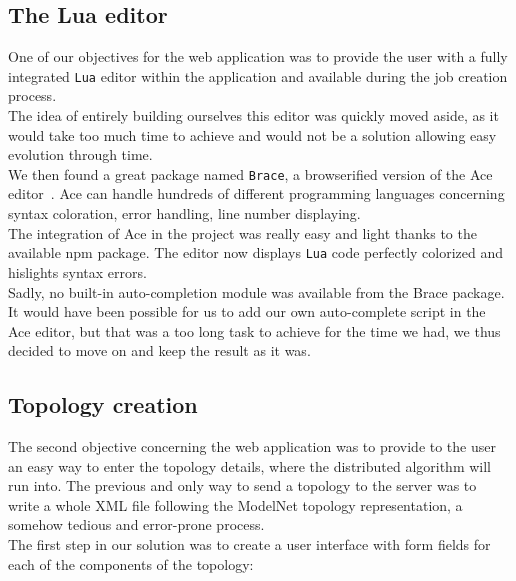 \documentclass{eplmastersthesis}
\begin{document}
        \subsection{The Lua editor}

          One of our objectives for the web application was to provide the user
          with a fully integrated \texttt{Lua} editor within the application and
          available during the job creation process.\\
          The idea of entirely building ourselves this editor was quickly
          moved aside, as it would take too much time to achieve and would not
          be a solution allowing easy evolution through time.\\
          We then found a great package named \texttt{Brace}, a browserified
          version of the Ace editor~\cite{Ace}. Ace can handle hundreds of
          different programming languages concerning syntax coloration,
          error handling, line number displaying.\\

          The integration of Ace in the project was really easy and light thanks
          to the available npm package. The editor now displays \texttt{Lua} code
          perfectly colorized and hislights syntax errors.\\

          Sadly, no built-in auto-completion module was available from the
          Brace package. It would have been possible for us to add our own
          auto-complete script in the Ace editor, but that was a too long
          task to achieve for the time we had, we thus decided to move on and
          keep the result as it was.

      \subsection{Topology creation}

        The second objective concerning the web application was to provide to the
        user an easy way to enter the topology details, where the distributed algorithm
        will run into. The previous and only way to send a topology
        to the server was to write a whole XML file following the ModelNet
        topology representation, a somehow tedious and error-prone process.\\

        The first step in our solution was to create a user interface with
        form fields for each of the components of the topology:
\end{document}

